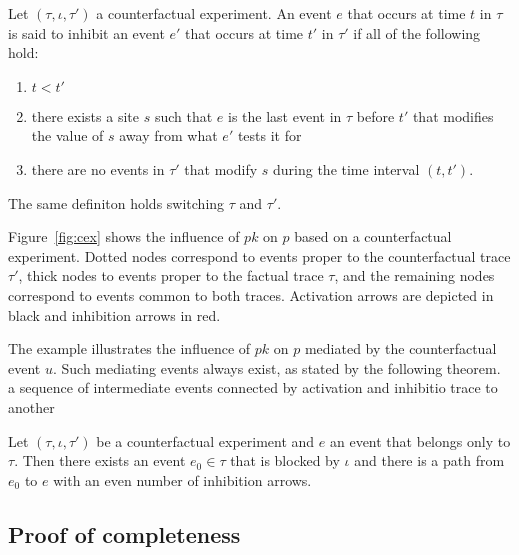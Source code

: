 \begin{definition}
  Let $(\tau, \iota, \tau')$ a counterfactual experiment. An
  event $e$ that occurs at time $t$ in $\tau$ is said to inhibit an
  event $e'$ that occurs at time $t'$ in $\tau'$ if all of the
  following hold:
  \begin{enumerate}[leftmargin=1.2cm, label=\textbf{IC\arabic*.}]
  \item \label{inhibition:time} $t < t'$
  \item \label{inhibition:breaks} there exists a site $s$ such that
    $e$ is the last event in $\tau$ before $t'$ that modifies the
    value of $s$ away from what $e'$ tests it for
  \item \label{inhibition:nointf} there are no events in $\tau'$ that
    modify $s$ during the time interval $(t, t')$.
  \end{enumerate}
  The same definiton holds switching $\tau$ and $\tau'$.
\end{definition}





Figure~\ref{fig:cex} shows the influence of $pk$ on $p$ based on a
counterfactual experiment. Dotted nodes correspond to events proper to
the counterfactual trace $\tau'$, thick nodes to events proper to the
factual trace $\tau$, and the remaining nodes correspond to events
common to both traces. Activation arrows are depicted in black and
inhibition arrows in red.

The example illustrates the influence of $pk$ on $p$ mediated by the
counterfactual event $u$. Such mediating events always exist, as
stated by the following theorem.  %
a sequence of intermediate events connected by activation and
inhibitio%
trace to another %

\begin{theorem} Let $(\tau, \iota, \tau')$ be a counterfactual
  experiment and $e$ an event that belongs only to $\tau$. Then there
  exists an event $e_0 \in \tau$ that is blocked by $\iota$ and there
  is a path from $e_0$ to $e$ with an even number of inhibition
  arrows.
\end{theorem}

\subsection*{Proof of completeness}

